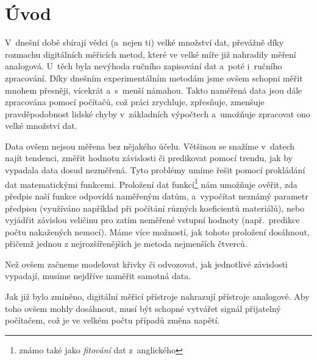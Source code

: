 \section{Úvod}
V~dnešní době sbírají vědci (a~nejen ti) velké množství dat, převážně díky
rozmachu digitálních měřicích metod, které ve velké míře již nahradily měření
analogová. U~těch byla nevýhoda ručního zapisování dat a~poté i~ručního
zpracování. Díky dnešním experimentálním metodám jsme ovšem schopni měřit
mnohem přesněji, vícekrát a~s~menší námahou. Takto naměřená data jsou dále
zpracována pomocí počítačů, což práci zrychluje, zpřesňuje, zmenšuje
pravděpodobnost lidské chyby v~základních výpočtech a~umožňuje zpracovat ono
velké množství dat.

Data ovšem nejsou měřena bez nějakého účelu. Většinou se snažíme v~datech najít
tendenci, změřit hodnotu závislosti či predikovat pomocí trendu, jak by
vypadala data dosud nezměřená. Tyto problémy umíme řešit pomocí prokládání dat
matematickými funkcemi. Proložení dat funkcí\footnote{známo také jako
\emph{fitování} dat z~anglického } nám umožňuje ověřit, zda předpis
naší funkce odpovídá naměřeným datům, a~vypočítat neznámý parametr předpisu
(využíváno například při počítání různých koeficientů materiálů), nebo
vyjádřit závislou veličinu pro zatím neměřené vstupní hodnoty (např.~predikce
počtu nakažených nemocí). Máme více možností, jak tohoto proložení dosáhnout,
přičemž jednou z nejrozšířenějších je metoda nejmenších čtverců.


Než ovšem začneme modelovat křivky či odvozovat, jak jednotlivé
závislosti vypadají, musíme nejdříve naměřit samotná data. 

Jak již bylo zmíněno, digitální měřicí přístroje nahrazují přístroje analogové.
Aby toho ovšem mohly dosáhnout, musí být schopné vytvářet signál přijatelný
počítačem, což je ve velkém počtu případů změna napětí. 

